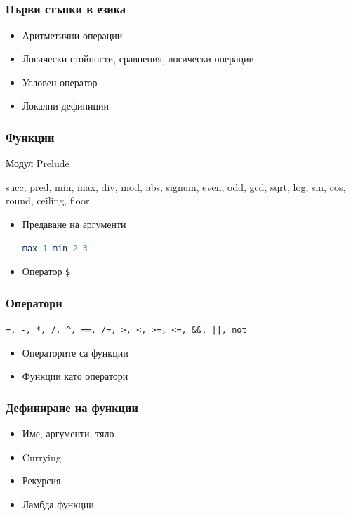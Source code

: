 \documentclass{beamer}
\begin{document}
\subsection{}

\begin{frame}[fragile]
  \frametitle{Първи стъпки в езика}
  \begin{itemize}
    \item Аритметични операции
    \item Логически стойности, сравнения, логически операции
    \item Условен оператор
    \item Локални дефиниции
  \end{itemize}
\end{frame}

\begin{frame}[fragile]
  \frametitle{Функции}

  Модул Prelude

  \bigskip

  succ, pred, min, max, div, mod, abs, signum, even, odd, gcd, sqrt, log, sin, cos, round, ceiling, floor

  \bigskip

  \begin{itemize}
    \item Предаване на аргументи
    \begin{lstlisting}[basicstyle=\small, language=Haskell]
    max 1 min 2 3
    \end{lstlisting}
    \item Оператор \verb|$|
  \end{itemize}
\end{frame}


\begin{frame}[fragile]
  \frametitle{Оператори}

  \verb#+, -, *, /, ^, ==, /=, >, <, >=, <=, &&, ||, not#

  \bigskip

  \begin{itemize}
    \item Операторите са функции
    \item Функции като оператори
  \end{itemize}
\end{frame}


\begin{frame}[fragile]
  \frametitle{Дефиниране на функции}

  \begin{itemize}
    \item Име, аргументи, тяло
    \item Currying
    \item Рекурсия
    \item Ламбда функции
  \end{itemize}
\end{frame}
\end{document}
